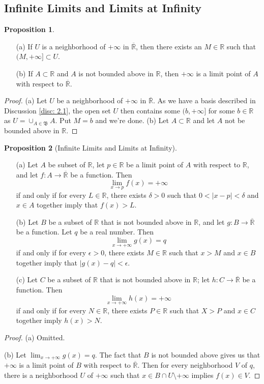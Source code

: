 \documentclass[oneside]{amsart}
\theoremstyle{definition}
\newtheorem{prop}{Proposition}[section]
\newcommand{\rr}{\mathbb R}
\begin{document}
\subsection{Infinite Limits and Limits at Infinity}
\begin{prop}\
\begin{itemize}
	\item [(a)] If $U$ is a neighborhood of $+\infty$ in $\overline{\rr}$, then there exists an $M \in \rr$ such that $(M, + \infty] \subset U$.
	\item [(b)] If $A \subset \rr$ and $A$ is not bounded above in $\rr$, then $+ \infty$ is a limit point of $A$ with respect to $\overline{\rr}$.
\end{itemize}	
\end{prop}
\begin{proof}(a) Let $U$ be a neighborhood of $+\infty$ in $\overline{\rr}$. As we have a basis described in Discussion \ref{disc: 2.1}, the open set $U$ then contains some $(b, + \infty]$ for some $b \in \rr$ as $U = \cup_{A \in \mathfrak B} A$. Put $M =b$ and we're done.
(b) Let $A \subset \rr$ and let $A$ not be bounded above in $\rr$.
\end{proof}
\begin{prop}
[Infinite Limits and Limits at Infinity] \
\begin{itemize}
	\item [(a)] Let $A$ be subset of $\rr$, let $p \in \rr$ be a limit point of $A$ with respect to $\rr$, and let $f \colon A \to \overline{\rr}$ be a function. Then $$ \lim_{x \to p}f(x) = + \infty$$ if and only if for every $L \in \rr$, there exists $\delta > 0$ such that $0< |x-p|< \delta$ and $x \in A$ together imply that $f(x) > L$.
	\item [(b)] Let $B$ be a subset of $\rr$ that is not bounded above in $\rr$, and let $g \colon B \to \overline{\rr}$ be a function. Let $q$ be a real number. Then $$ \lim_{x \to + \infty} g(x) = q$$ if and only if for every $\epsilon > 0$, there exists $M \in \rr$ such that $x > M$ and $x \in B$ together imply that $ | g(x) -q| < \epsilon$.
	\item [(c)] Let $C$ be a subset of $\rr$ that is not bounded above in $\rr$; let $h \colon C \to \overline{\rr}$ be a function. Then $$ \lim_{x \to + \infty} h(x) = +\infty$$ if and only if for every $N \in \rr$, there exists $P \in \rr$ such that $X>P$ and $x \in C$ together imply $h(x) > N$.
\end{itemize}	
\end{prop}
\begin{proof}(a) Omitted.

(b) Let $\lim_{x \to + \infty} g(x) = q$. The fact that $B$ is not bounded above gives us that $+\infty$ is a limit point of $B$ with respect to $\overline{\rr}$. Then for every neighborhood $V$ of $q$, there is a neighborhood $U$ of $+\infty$ such that $x \in B \cap U \setminus {+\infty}$ implies $f(x) \in V$.
	
\end{proof}
\end{document}
